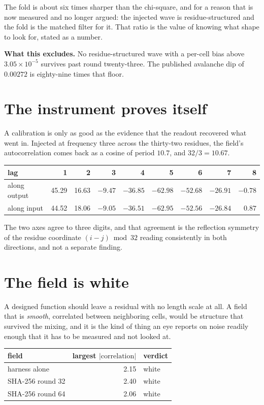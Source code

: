 The fold is about six times sharper than the chi-square, and for a reason that is now measured
and no longer argued: the injected wave is residue-structured and the fold is the matched filter for
it. That ratio is the value of knowing what shape to look for, stated as a number.

\textbf{What this excludes.} No residue-structured wave with a per-cell bias above
\(3.05 \times 10^{-5}\) survives past round twenty-three. The published avalanche dip of
\(0.00272\) is eighty-nine times that floor.

\section{The instrument proves itself}

A calibration is only as good as the evidence that the readout recovered what went in. Injected at
frequency three across the thirty-two residues, the field's autocorrelation comes back as a cosine
of period \(10.7\), and \(32/3 = 10.67\).

\begin{center}
\begin{tabular}{lrrrrrrrr}
\toprule
lag & 1 & 2 & 3 & 4 & 5 & 6 & 7 & 8 \\
\midrule
along output & 45.29 & 16.63 & \(-9.47\) & \(-36.85\) & \(-62.98\) & \(-52.68\) & \(-26.91\) & \(-0.78\) \\
along input & 44.52 & 18.06 & \(-9.05\) & \(-36.51\) & \(-62.95\) & \(-52.56\) & \(-26.84\) & \(0.87\) \\
\bottomrule
\end{tabular}
\end{center}

The two axes agree to three digits, and that agreement is the reflection symmetry of the residue coordinate
\((i - j) \bmod 32\) reading consistently in both directions, and not a separate finding.

\section{The field is white}

A designed function should leave a residual with no length scale at all. A field that is
\emph{smooth}, correlated between neighboring cells, would be structure that survived the
mixing, and it is the kind of thing an eye reports on noise readily enough that it has to be
measured and not looked at.

\begin{center}
\begin{tabular}{lrl}
\toprule
field & largest \(|\text{correlation}|\) & verdict \\
\midrule
harness alone & 2.15 & white \\
SHA-256 round 32 & 2.40 & white \\
SHA-256 round 64 & 2.06 & white \\
\bottomrule
\end{tabular}
\end{center}

